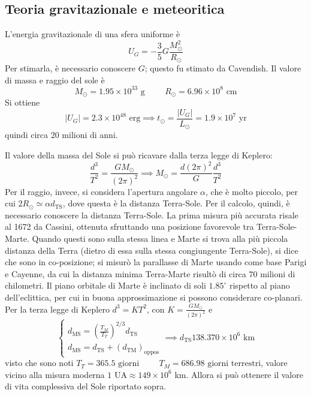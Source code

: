 \documentclass[11pt, a4paper]{scrartcl}
\theoremstyle{style}
\numberwithin{equation}{subsection}
\begin{document}
\subsection{Teoria gravitazionale e meteoritica}

L'energia gravitazionale di una sfera uniforme \`e 
\[
U_ G= - \frac{3}{5} G \frac{M_\odot ^2}{R_\odot }
\] 
Per stimarla, \`e necessario conoscere $G$; questo fu stimato da Cavendish.
Il valore di massa e raggio del sole \`e 
\[
M_\odot  = 1.95 \times 10^{33} \text{ g} \hspace{1cm} R_\odot  = 6.96 \times 10^{8} \text{ cm}
\] 
Si ottiene 
\[
\lvert U_G \rvert  = 2.3 \times 10^{48} \text{ erg} \implies t_\odot  = \frac{\lvert U_G \rvert }{L_\odot } = 1.9 \times 10^{7} \text{ yr}
\] 
quindi circa 20 milioni di anni.

Il valore della massa del Sole si pu\`o ricavare dalla terza legge di Keplero:
\[
\frac{d^3}{T^2} = \frac{GM_\odot }{(2\pi)^2} \implies M_\odot  = \frac{d(2\pi)^2}{G} \frac{d^3}{T^2}
\] 
Per il raggio, invece, si considera l'apertura angolare $\alpha $, che \`e molto piccolo, per cui $2R_\odot  \simeq \alpha  d_\text{TS}$, dove questa \`e la distanza Terra-Sole.
Per il calcolo, quindi, \`e necessario conoscere la distanza Terra-Sole.
La prima misura pi\`u accurata risale al 1672 da Cassini, ottenuta sfruttando una posizione favorevole tra Terra-Sole-Marte.
Quando questi sono sulla stessa linea e Marte si trova alla pi\`u piccola distanza della Terra (dietro di essa sulla stessa congiungente Terra-Sole), si dice che sono in co-posizione; si misur\`o la parallasse di Marte usando come base Parigi e Cayenne, da cui la distanza minima Terra-Marte risult\`o di circa $70$ milioni di chilometri.
Il piano orbitale di Marte \`e inclinato di soli $1.85^\circ$ rispetto al piano dell'eclittica, per cui in buona approssimazione si possono considerare co-planari.
Per la terza legge di Keplero $d^3 = KT^2$, con $K = \frac{GM_\odot }{(2\pi)^2}$ e 
\[
	\begin{cases}
		d_\text{MS} = \left(\frac{T_M}{T_T}\right) ^{2 / 3} d_\text{TS}\\
		d_\text{MS} = d_\text{TS} + (d_\text{TM}) _\text{oppos}
	\end{cases} \implies d_\text{TS} 138.370 \times 10^{6} \text{ km}
\] 
visto che sono noti $T_T = 365.5 \text{ giorni} \hspace{1cm} T_M = 686.98 \text{ giorni terrestri}$, valore vicino alla misura moderna $1 \text{ UA} \approx 149 \times {10}^{6}$ km.
Allora si pu\`o ottenere il valore di vita complessiva del Sole riportato sopra.
\end{document}
